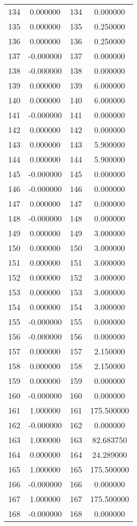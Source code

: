 \documentclass[12pt]{article}
\begin{document}
\begin{longtable}{@{}cccc@{}}
134 & 0.000000 & 134 & 0.000000 \\
135 & 0.000000 & 135 & 0.250000 \\
136 & 0.000000 & 136 & 0.250000 \\
137 & -0.000000 & 137 & 0.000000 \\
138 & -0.000000 & 138 & 0.000000 \\
139 & 0.000000 & 139 & 6.000000 \\
140 & 0.000000 & 140 & 6.000000 \\
141 & -0.000000 & 141 & 0.000000 \\
142 & 0.000000 & 142 & 0.000000 \\
143 & 0.000000 & 143 & 5.900000 \\
144 & 0.000000 & 144 & 5.900000 \\
145 & -0.000000 & 145 & 0.000000 \\
146 & -0.000000 & 146 & 0.000000 \\
147 & 0.000000 & 147 & 0.000000 \\
148 & -0.000000 & 148 & 0.000000 \\
149 & 0.000000 & 149 & 3.000000 \\
150 & 0.000000 & 150 & 3.000000 \\
151 & 0.000000 & 151 & 3.000000 \\
152 & 0.000000 & 152 & 3.000000 \\
153 & 0.000000 & 153 & 3.000000 \\
154 & 0.000000 & 154 & 3.000000 \\
155 & -0.000000 & 155 & 0.000000 \\
156 & -0.000000 & 156 & 0.000000 \\
157 & 0.000000 & 157 & 2.150000 \\
158 & 0.000000 & 158 & 2.150000 \\
159 & 0.000000 & 159 & 0.000000 \\
160 & -0.000000 & 160 & 0.000000 \\
161 & 1.000000 & 161 & 175.500000 \\
162 & -0.000000 & 162 & 0.000000 \\
163 & 1.000000 & 163 & 82.683750 \\
164 & 0.000000 & 164 & 24.289000 \\
165 & 1.000000 & 165 & 175.500000 \\
166 & -0.000000 & 166 & 0.000000 \\
167 & 1.000000 & 167 & 175.500000 \\
168 & -0.000000 & 168 & 0.000000 \\

\end{longtable}
\end{document}
